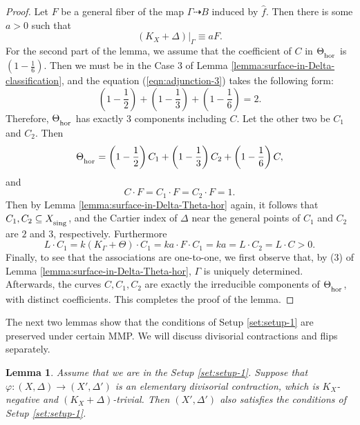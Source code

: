 \documentclass[12pt]{amsart}
\newcommand{\<}{\leq}
\newcommand{\D}{\Delta}
\newtheorem{lemma}[theorem]{Lemma}
\theoremstyle{remark}
\theoremstyle{definition}
\theoremstyle{definition}
\numberwithin{equation}{section}
\theoremstyle{definition}
\theoremstyle{definition}
\def\hor{\operatorname{\hor}}
\def\sing{\operatorname{\textsubscript{\rm sing}}}
\def\hor{\operatorname{\textsubscript{\rm hor}}}
\begin{document}
\begin{proof}
Let $F$ be a general fiber of the  map $\Gamma \dashrightarrow B$ induced by $\hat{f}$. 
Then there is some $a>0$ such that 
\[(K_X+\D)|_\Gamma \equiv aF.\]
For the second part of the lemma, we assume that the coefficient of ${C}$ in $\Theta_{\hor}$ is $(1-\frac{1}{6})$. 
Then we must be in the Case 3 of Lemma \ref{lemma:surface-in-Delta-classification}, and the equation (\ref{eqn:adjunction-3}) takes the following form:
 \[
 \left(1-\frac{1}{2}\right)+\left(1-\frac{1}{3}\right)+\left(1-\frac{1}{6}\right)=2.
 \]
Therefore,  $\Theta_{\hor}$ has exactly $3$ components including $ C$.  
 Let the other two be $C_1$ and $ C_2$. 
 Then \[\Theta_{\hor}=\left(1-\frac12\right)  C_1+\left(1-\frac13\right) C_2+\left(1-\frac 16\right) C,\] 
 and 
 \[ C\cdot F= C_1\cdot F= C_2\cdot F=1.\]  
 Then by Lemma \ref{lemma:surface-in-Delta-Theta-hor} again, it follows that $C_1, C_2 \subseteq X_{\sing}$, and the Cartier index of $\Delta$ near the general points of $C_1$ and $C_2$ are $2$ and $3$, respectively. 
 Furthermore 
 \[L\cdot C_1= k(K_{ \Gamma}+\Theta)\cdot C_1 =ka\cdot F\cdot C_1=ka=L\cdot C_2=L\cdot C>0.\] 
 Finally, to see that the associations are one-to-one, we first observe that, by (3) of Lemma \ref{lemma:surface-in-Delta-Theta-hor},  $\Gamma$ is uniquely determined. 
 Afterwards,   the curves $C,C_1,C_2$ are exactly the irreducible components  of $\Theta_{\hor}$, with distinct coefficients. 
 This completes the proof of the lemma.
\end{proof}


 

The next two lemmas show that the conditions of Setup  \ref{set:setup-1} are  preserved under certain MMP.  
We will discuss  divisorial contractions and flips separately.

\begin{lemma}
\label{lemma:contraction-dlt}
Assume that we are in the Setup \ref{set:setup-1}.  
Suppose that $\varphi \colon (X,\D) \to (X', \D')$ is an elementary divisorial contraction, which is $K_X$-negative and $(K_X+\D)$-trivial. 
Then $(X',\D')$ also satisfies the conditions of Setup \ref{set:setup-1}. 
\end{lemma}
\end{document}
